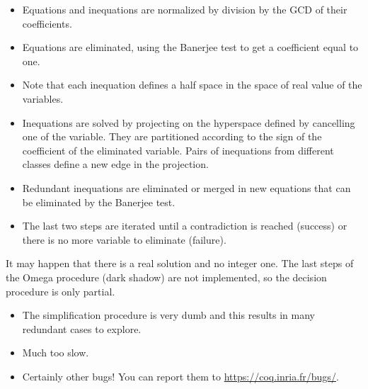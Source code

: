 \begin{itemize}

\item Equations and inequations are normalized by division by the GCD of their
     coefficients.
\item Equations are eliminated, using the Banerjee test to get a coefficient 
     equal to one.
\item Note that each inequation defines a half space in the space of real value
     of the variables.
   \item Inequations are solved by projecting on the hyperspace
     defined by cancelling one of the variable.  They are partitioned
     according to the sign of the coefficient of the eliminated
     variable. Pairs of inequations from different classes define a
     new edge in the projection.
   \item Redundant inequations are eliminated or merged in new
     equations that can be eliminated by the Banerjee test.
\item The last two steps are iterated until a contradiction is reached
     (success) or there is no more variable to eliminate (failure).

\end{itemize}

It may happen that there is a real solution and no integer one. The last
steps of the Omega procedure (dark shadow) are not implemented, so the 
decision procedure is only partial.


\begin{itemize}
\item The simplification procedure is very dumb and this results in
  many redundant cases to explore.

\item Much too slow.

\item Certainly other bugs! You can report them to \url{https://coq.inria.fr/bugs/}.

\end{itemize}

